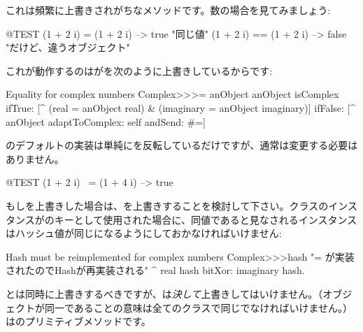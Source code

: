 \documentclass[a4paper,10pt,twoside]{book}
\begin{document}
これは頻繁に上書きされがちなメソッドです。数の場合を見てみましょう:

\begin{code}{@TEST}
(1 + 2 i) = (1 + 2 i)   --> true     "同じ値"
(1 + 2 i) == (1 + 2 i) --> false    "だけど、違うオブジェクト"
\end{code}

これが動作するのはが\ct{=}を次のように上書きしているからです:
\begin{method}{Equality for complex numbers}
Complex>>>= anObject
    anObject isComplex
        ifTrue: [^ (real = anObject real) & (imaginary = anObject imaginary)]
        ifFalse: [^ anObject adaptToComplex: self andSend: #=]
\end{method}

のデフォルトの実装は単純にを反転しているだけですが、通常は変更する必要はありません。

\begin{code}{@TEST}
(1 + 2 i) ~= (1 + 4 i) --> true
\end{code}

もし\ct{=}を上書きした場合は、を上書きすることを検討して下さい。クラスのインスタンスがのキーとして使用された場合に、同値であると見なされるインスタンスはハッシュ値が同じになるようにしておかなければいけません:
\begin{method}{Hash must be reimplemented for complex numbers}
Complex>>>hash
    "= が実装されたのでHashが再実装される"
    ^ real hash bitXor: imaginary hash.
\end{method}

\ct{=}とは同時に上書きするべきですが、\ct{==}は\emph{決して}上書きしてはいけません。（オブジェクトが同一であることの意味は全てのクラスで同じでなければいけません。）\ct{==}はのプリミティブメソッドです。
\end{document}
